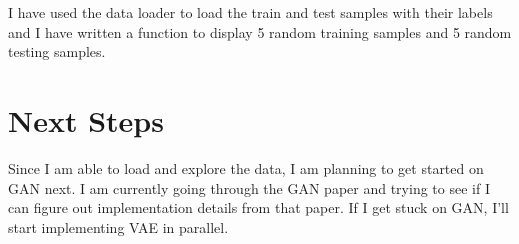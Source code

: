 \documentclass{article}
\begin{document}
I have used the data loader to load the train and test samples with their labels and I have written a function to display 5 random training samples and 5 random testing samples.




\section{Next Steps}

Since I am able to load and explore the data, I am planning to get started on GAN next. I am currently going through the GAN paper and trying to see if I can figure out implementation details from that paper. If I get stuck on GAN, I'll start implementing VAE in parallel.
\end{document}
